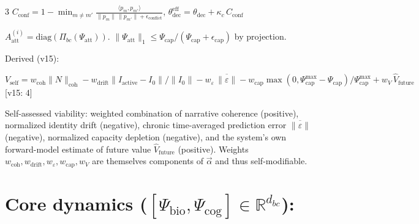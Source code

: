 \documentclass[8pt,landscape]{extarticle}
\newcommand{\vnew}[1]{\textcolor{v13color}{#1}}
\newcommand{\vfive}[1]{\textcolor{v15color}{#1}}
\newcommand{\vfivelabel}[1]{\textcolor{v15color}{\textsf{\scriptsize[v15: #1]}}}
\begin{document}
\begin{multicols}{3}
$C_{\mathrm{conf}} = 1 - \min_{m \ne m'} \frac{\langle p_m, p_{m'}\rangle}{\|p_m\|\,\|p_{m'}\| + \epsilon_{\mathrm{conflict}}}$, \qquad $\theta^{\mathrm{eff}}_{\mathrm{dec}} = \theta_{\mathrm{dec}} + \kappa_c\,C_{\mathrm{conf}}$

\vnew{$A_{\mathrm{att}}^{(i)} = \mathrm{diag}(\Pi_{bc}(\Psi_{\mathrm{att}}))$. \quad $\|\Psi_{\mathrm{att}}\|_1 \le \Psi_{\mathrm{cap}} / (\Psi_{\mathrm{cap}} + \epsilon_{\mathrm{cap}})$ by projection.}

\vfive{Derived (v15):}

\vfive{$V_{\mathrm{self}} = w_{\mathrm{coh}}\|N\|_{\mathrm{coh}} - w_{\mathrm{drift}}\|I_{\mathrm{active}} - I_0\|/\|I_0\| - w_\varepsilon\,\overline{\|\varepsilon\|} - w_{\mathrm{cap}}\max(0, \Psi^{\max}_{\mathrm{cap}} - \Psi_{\mathrm{cap}})/\Psi^{\max}_{\mathrm{cap}} + w_V\,\hat{V}_{\mathrm{future}}$} \vfivelabel{4}

\vfive{Self-assessed viability: weighted combination of narrative coherence (positive), normalized identity drift (negative), chronic time-averaged prediction error $\overline{\|\varepsilon\|}$ (negative), normalized capacity depletion (negative), and the system's own forward-model estimate of future value $\hat{V}_{\mathrm{future}}$ (positive). Weights $w_{\mathrm{coh}}, w_{\mathrm{drift}}, w_\varepsilon, w_{\mathrm{cap}}, w_V$ are themselves components of $\vec\alpha$ and thus self-modifiable.}

\section*{Core dynamics ($[\Psi_{\mathrm{bio}}, \Psi_{\mathrm{cog}}] \in \mathbb{R}^{d_{bc}}$):}


\end{multicols}
\end{document}
